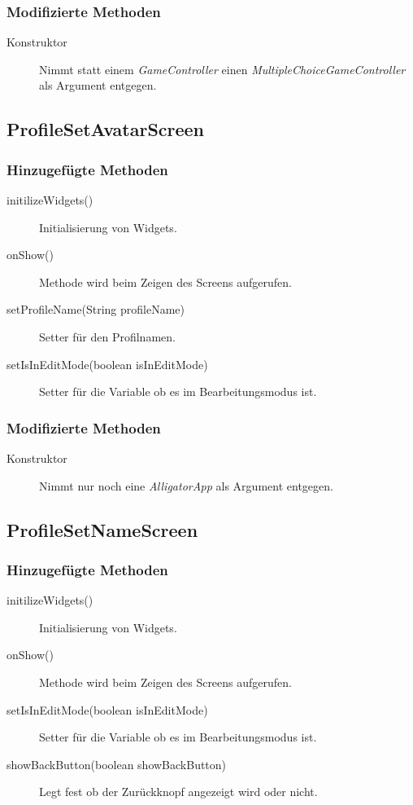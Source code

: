 \subsubsection{Modifizierte Methoden}
\begin{description}
\item[Konstruktor]
Nimmt statt einem \emph{GameController} einen \emph{MultipleChoiceGameController} als Argument entgegen.

\end{description}



\subsection{ProfileSetAvatarScreen}

\subsubsection{Hinzugefügte Methoden}
\begin{description}
\item[initilizeWidgets()]
Initialisierung von Widgets.
\item[onShow()]
Methode wird beim Zeigen des Screens aufgerufen.
\item[setProfileName(String profileName)]
Setter für den Profilnamen.
\item[setIsInEditMode(boolean isInEditMode)]
Setter für die Variable ob es im Bearbeitungsmodus ist.
\end{description}

\subsubsection{Modifizierte Methoden}
\begin{description}
\item[Konstruktor]
Nimmt nur noch eine \emph{AlligatorApp} als Argument entgegen.

\end{description}



\subsection{ProfileSetNameScreen}

\subsubsection{Hinzugefügte Methoden}
\begin{description}
\item[initilizeWidgets()]
Initialisierung von Widgets.
\item[onShow()]
Methode wird beim Zeigen des Screens aufgerufen.
\item[setIsInEditMode(boolean isInEditMode)]
Setter für die Variable ob es im Bearbeitungsmodus ist.
\item[showBackButton(boolean showBackButton)]
Legt fest ob der Zurückknopf angezeigt wird oder nicht.
\end{description}

